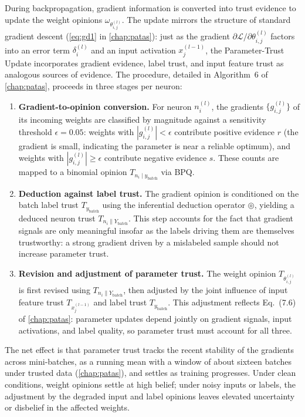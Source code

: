 During backpropagation, gradient information is converted into trust evidence to update the weight opinions $\omega_{\theta_{i,j}^{(l)}}$. The update mirrors the structure of standard gradient descent (\cref{eq:gd1} in \cref{chap:patas}): just as the gradient $\partial \mathcal{L}/\partial \theta_{i,j}^{(l)}$ factors into an error term $\delta_i^{(l)}$ and an input activation $x_j^{(l-1)}$, the Parameter-Trust Update incorporates gradient evidence, label trust, and input feature trust as analogous sources of evidence. The procedure, detailed in Algorithm~6 of \cref{chap:patas}, proceeds in three stages per neuron:

\begin{enumerate}
    \item \textbf{Gradient-to-opinion conversion.} For neuron $n_i^{(l)}$, the gradients $\{g_{i,j}^{(l)}\}$ of its incoming weights are classified by magnitude against a sensitivity threshold $\epsilon = 0.05$: weights with $|g_{i,j}^{(l)}| < \epsilon$ contribute positive evidence $r$ (the gradient is small, indicating the parameter is near a reliable optimum), and weights with $|g_{i,j}^{(l)}| \geq \epsilon$ contribute negative evidence $s$. These counts are mapped to a binomial opinion $T_{n_i \mid y_{\text{batch}}}$ via \ac{BPQ}.

    \item \textbf{Deduction against label trust.} The gradient opinion is conditioned on the batch label trust $T_{y_{\text{batch}}}$ using the inferential deduction operator $\circledcirc$, yielding a deduced neuron trust $T_{n_i \| Y_{\text{batch}}}$. This step accounts for the fact that gradient signals are only meaningful insofar as the labels driving them are themselves trustworthy: a strong gradient driven by a mislabeled sample should not increase parameter trust.

    \item \textbf{Revision and adjustment of parameter trust.} The weight opinion $T_{\theta_{i,j}^{(l)}}$ is first revised using $T_{n_i \| Y_{\text{batch}}}$, then adjusted by the joint influence of input feature trust $T_{x_j^{(l-1)}}$ and label trust $T_{y_{\text{batch}}}$. This adjustment reflects Eq.~(7.6) of \cref{chap:patas}: parameter updates depend jointly on gradient signals, input activations, and label quality, so parameter trust must account for all three.
\end{enumerate}

The net effect is that parameter trust tracks the recent stability of the gradients across mini-batches, as a running mean with a window of about sixteen batches under trusted data (\cref{chap:patas}), and settles as training progresses. Under clean conditions, weight opinions settle at high belief; under noisy inputs or labels, the adjustment by the degraded input and label opinions leaves elevated uncertainty or disbelief in the affected weights.


